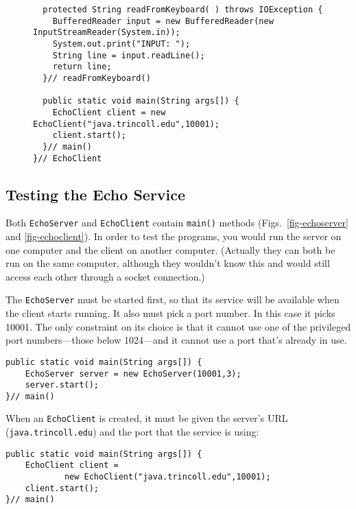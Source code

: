 {\begin{figure}[p]
\begin{jjjlisting}[37pc]
\begin{lstlisting}
  protected String readFromKeyboard( ) throws IOException {
    BufferedReader input = new BufferedReader(new InputStreamReader(System.in));
    System.out.print("INPUT: ");
    String line = input.readLine();
    return line;
  }// readFromKeyboard()

  public static void main(String args[]) {
    EchoClient client = new EchoClient("java.trincoll.edu",10001);
    client.start();
  }// main()
}// EchoClient
\end{lstlisting}
\end{jjjlisting}
\end{figure}


\subsection*{Testing the Echo Service}
\noindent Both {\tt EchoServer} and {\tt EchoClient} contain {\tt main()}
methods (Figs.~\ref{fig-echoserver} and \ref{fig-echoclient}). In
order to test the programs, you would run the server on one computer
and the client on another computer.  (Actually they can both be run on the
same computer, although they wouldn't know this and would still access
each other through a socket connection.)



The {\tt EchoServer} must be started first, so that its service will
be available when the client starts running.  It also must pick a port
number.   In this case it picks 10001. The only constraint on its
choice is that it cannot use one of the privileged port numbers---those 
below 1024---and it cannot use a port that's already in use.

\begin{jjjlisting}
\begin{lstlisting}
public static void main(String args[]) {
    EchoServer server = new EchoServer(10001,3);
    server.start();
}// main()
\end{lstlisting}
\end{jjjlisting}

\noindent When an {\tt EchoClient} is created, it must be given the server's
URL ({\tt java.\-trincoll.edu}) and the port that the service is using:

\begin{jjjlisting}
\begin{lstlisting}
public static void main(String args[]) {
    EchoClient client = 
            new EchoClient("java.trincoll.edu",10001);
    client.start();
}// main()
\end{lstlisting}
\end{jjjlisting}

}
